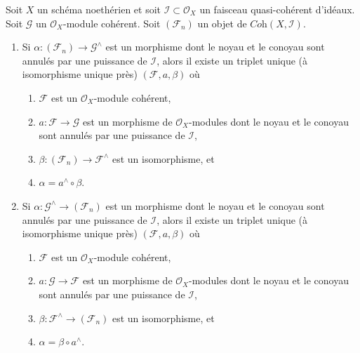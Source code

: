 \begin{lemma}
\label{lemma-existence-easy}
Soit $X$ un schéma noethérien et soit $\mathcal{I} \subset \mathcal{O}_X$
un faisceau quasi-cohérent d'idéaux. Soit $\mathcal{G}$ un
$\mathcal{O}_X$-module cohérent. Soit $(\mathcal{F}_n)$ un objet de
$\textit{Coh}(X, \mathcal{I})$.
\begin{enumerate}
\item Si $\alpha : (\mathcal{F}_n) \to \mathcal{G}^\wedge$ est
un morphisme dont le noyau et le conoyau sont annulés par une puissance de $\mathcal{I}$,
alors il existe un triplet unique (à isomorphisme unique près)
$(\mathcal{F}, a, \beta)$ où
\begin{enumerate}
\item $\mathcal{F}$ est un $\mathcal{O}_X$-module cohérent,
\item $a : \mathcal{F} \to \mathcal{G}$ est un morphisme de $\mathcal{O}_X$-modules
dont le noyau et le conoyau sont annulés par une puissance de $\mathcal{I}$,
\item $\beta : (\mathcal{F}_n) \to \mathcal{F}^\wedge$ est un isomorphisme, et
\item $\alpha = a^\wedge \circ \beta$.
\end{enumerate}
\item Si $\alpha : \mathcal{G}^\wedge \to (\mathcal{F}_n)$ est
un morphisme dont le noyau et le conoyau sont annulés par une puissance de $\mathcal{I}$,
alors il existe un triplet unique (à isomorphisme unique près)
$(\mathcal{F}, a, \beta)$ où
\begin{enumerate}
\item $\mathcal{F}$ est un $\mathcal{O}_X$-module cohérent,
\item $a : \mathcal{G} \to \mathcal{F}$ est un morphisme de $\mathcal{O}_X$-modules
dont le noyau et le conoyau sont annulés par une puissance de $\mathcal{I}$,
\item $\beta : \mathcal{F}^\wedge \to (\mathcal{F}_n)$ est un isomorphisme, et
\item $\alpha = \beta \circ a^\wedge$.
\end{enumerate}
\end{enumerate}
\end{lemma}

